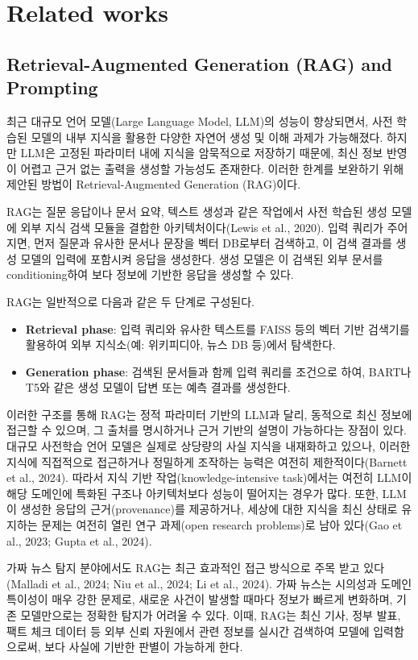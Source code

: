 \documentclass[a4paper,fleqn]{cas-sc}
\begin{document}
\section{Related works}


\subsection{Retrieval-Augmented Generation (RAG) and Prompting}
최근 대규모 언어 모델(Large Language Model, LLM)의 성능이 향상되면서, 사전 학습된 모델의 내부 지식을 활용한 다양한 자연어 생성 및 이해 과제가 가능해졌다. 하지만 LLM은 고정된 파라미터 내에 지식을 암묵적으로 저장하기 때문에, 최신 정보 반영이 어렵고 근거 없는 출력을 생성할 가능성도 존재한다. 이러한 한계를 보완하기 위해 제안된 방법이 Retrieval-Augmented Generation (RAG)이다.

RAG는 질문 응답이나 문서 요약, 텍스트 생성과 같은 작업에서 사전 학습된 생성 모델에 외부 지식 검색 모듈을 결합한 아키텍처이다(Lewis et al., 2020). 입력 쿼리가 주어지면, 먼저 질문과 유사한 문서나 문장을 벡터 DB로부터 검색하고, 이 검색 결과를 생성 모델의 입력에 포함시켜 응답을 생성한다. 생성 모델은 이 검색된 외부 문서를 conditioning하여 보다 정보에 기반한 응답을 생성할 수 있다.

RAG는 일반적으로 다음과 같은 두 단계로 구성된다.
\begin{itemize}
    \item{\textbf{Retrieval phase}:
    입력 쿼리와 유사한 텍스트를 FAISS 등의 벡터 기반 검색기를 활용하여 외부 지식소(예: 위키피디아, 뉴스 DB 등)에서 탐색한다.}
    \item{\textbf{Generation phase}:
    검색된 문서들과 함께 입력 쿼리를 조건으로 하여, BART나 T5와 같은 생성 모델이 답변 또는 예측 결과를 생성한다.}
\end{itemize}
이러한 구조를 통해 RAG는 정적 파라미터 기반의 LLM과 달리, 동적으로 최신 정보에 접근할 수 있으며, 그 출처를 명시하거나 근거 기반의 설명이 가능하다는 장점이 있다.
대규모 사전학습 언어 모델은 실제로 상당량의 사실 지식을 내재화하고 있으나, 이러한 지식에 직접적으로 접근하거나 정밀하게 조작하는 능력은 여전히 제한적이다(Barnett et al., 2024). 따라서 지식 기반 작업(knowledge-intensive task)에서는 여전히 LLM이 해당 도메인에 특화된 구조나 아키텍처보다 성능이 떨어지는 경우가 많다. 또한, LLM이 생성한 응답의 근거(provenance)를 제공하거나, 세상에 대한 지식을 최신 상태로 유지하는 문제는 여전히 열린 연구 과제(open research problems)로 남아 있다(Gao et al., 2023; Gupta et al., 2024).

가짜 뉴스 탐지 분야에서도 RAG는 최근 효과적인 접근 방식으로 주목 받고 있다(Malladi et al., 2024; Niu et al., 2024; Li et al., 2024). 가짜 뉴스는 시의성과 도메인 특이성이 매우 강한 문제로, 새로운 사건이 발생할 때마다 정보가 빠르게 변화하며, 기존 모델만으로는 정확한 탐지가 어려울 수 있다. 이때, RAG는 최신 기사, 정부 발표, 팩트 체크 데이터 등 외부 신뢰 자원에서 관련 정보를 실시간 검색하여 모델에 입력함으로써, 보다 사실에 기반한 판별이 가능하게 한다.
\end{document}
